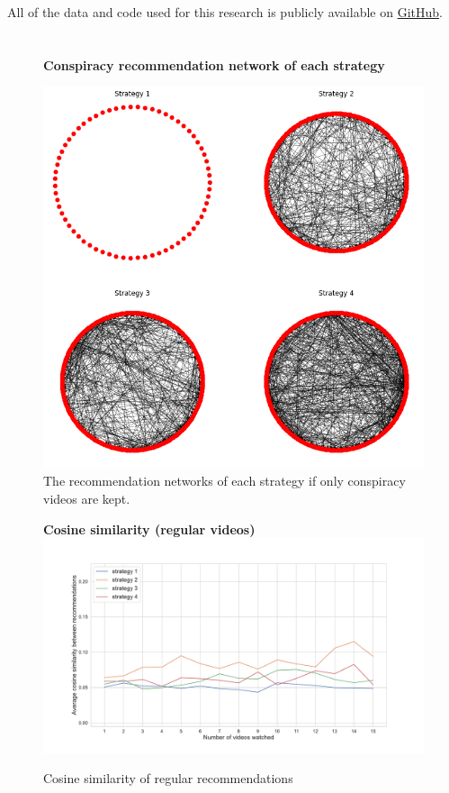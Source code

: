 
\begin{appendices}
\appendix
{}

\noindent All of the data and code used for this research is publicly available on \href{https://github.com/Roan-Schellingerhout/bachelor_scriptie}{GitHub}.

\section{}
\begin{figure}[h]
  \textbf{Conspiracy recommendation network of each strategy}\par\medskip
  \centering
  \includegraphics[keepaspectratio, width=\textwidth]{images/conspiracy networks.png}
  \caption{The recommendation networks of each strategy if only conspiracy videos are kept.}
  \label{appendix:networks}
\end{figure}

\begin{figure}
\textbf{Cosine similarity (regular videos)}
\centering
\includegraphics[width=\textwidth]{images/Reg sim.pdf}
\caption{Cosine similarity of regular recommendations}
\label{appendix:reg_sim}
\end{figure}


\end{appendices}
